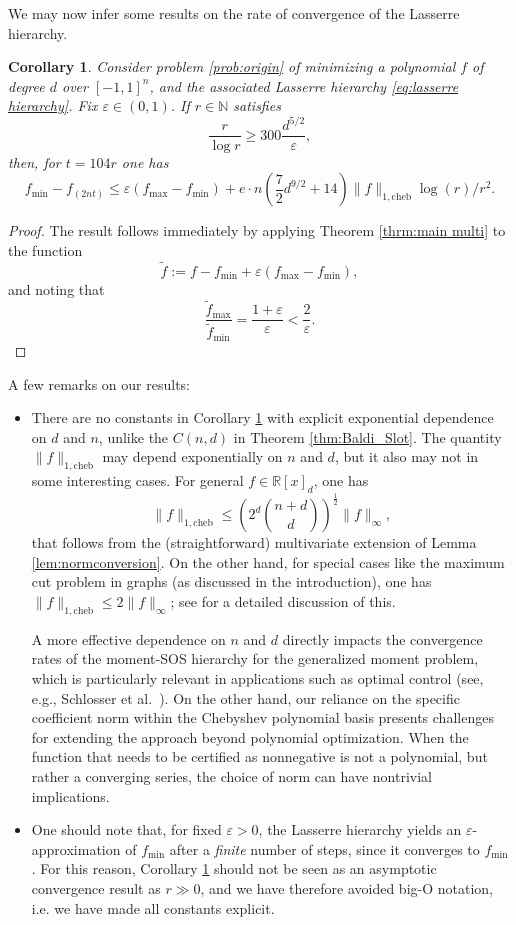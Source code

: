 \documentclass[11pt]{article}
\newcommand{\N}{\mathbb{N}}
\newcommand{\R}{\mathbb{R}}
\renewcommand{\min}{\mathrm{min}}
\renewcommand{\max}{\mathrm{max}}
\renewcommand{\epsilon}{\varepsilon}
\newtheorem{corollary}[defin]{Corollary}
\theoremstyle{definition}
\newcommand{\cheb}{{1,\mathrm{cheb}}}
\begin{document}
We may now infer some results on the rate of convergence of the Lasserre hierarchy.

\begin{corollary}
\label{cor:main result}
Consider problem \eqref{prob:origin} of minimizing a polynomial $f$ of degree $d$ over $[-1,1]^n$, and the associated Lasserre hierarchy \eqref{eq:lasserre hierarchy}.
Fix $\varepsilon \in (0,1)$. If  $r \in \N$ satisfies
\[
\frac{r}{\log r} \ge 300\frac{d^{5/2}}{\varepsilon},
\]
then, for $t = {104r}$ one has
\[
f_\min - f_{(2nt)} \le \varepsilon(f_\max - f_\min) + e\cdot n\left( {\frac{7}{2}d^{9/2}} + 14\right)\|f\|_\cheb \log(r)/r^2.
\]
\end{corollary}
\begin{proof}
The result follows immediately by applying Theorem \ref{thrm:main multi} to the function
\[
\tilde f := f - f_\min + \varepsilon (f_\max - f_\min),
\]
and noting that
\[
\frac{\tilde f_\max}{\tilde f_\min} = \frac{1+ \varepsilon}{\varepsilon} < \frac{2}{\epsilon}.
\]
\end{proof}
A few remarks on our results:
\begin{itemize}
\item
   There are no constants in Corollary \ref{cor:main result} with explicit exponential dependence on $d$ and $n$,  unlike the $C(n,d)$ in Theorem \ref{thm:Baldi_Slot}. The quantity $\|f\|_\cheb$ may depend exponentially on $n$ and $d$, but it also may not in some interesting cases.
   For general $f \in \R[x]_d$, one has
\[
\|f\|_\cheb \le \left(2^d \binom{n+d}{d}\right)^{ \frac{1}{2}}\|f\|_{\infty},
\]
that follows from the (straightforward) multivariate extension of Lemma \ref{lem:normconversion}. On the other hand, for special cases like the maximum cut problem in graphs (as discussed in the introduction), one has $\|f\|_\cheb \le 2\|f\|_{\infty}$; see \cite{De_Klerk_Vera_2024} for a detailed discussion of this.

{A more effective dependence on $n$ and $d$ directly impacts the convergence rates of the moment-SOS hierarchy
 for the generalized moment problem, which is particularly relevant in applications such as optimal control
 (see, e.g., Schlosser et al.\ \cite{Schlosser_et_al}). On the other hand,
 our reliance on the specific coefficient norm within the Chebyshev polynomial basis presents challenges
 for extending the approach beyond polynomial optimization. When the function
 that needs to be certified as nonnegative is not a polynomial, but rather a converging series, the choice of norm can have nontrivial implications. }
    \item
   One should note that, for fixed $\varepsilon > 0$, the Lasserre
   hierarchy yields an $\varepsilon$-approximation of $f_\min$ after a \textit{finite} number of steps, since it converges to $f_\min$.
   For this reason,
   Corollary \ref{cor:main result} should not be seen as an asymptotic convergence result as $r \gg 0$, and we have therefore avoided big-O notation, i.e. we have made all constants explicit.

   \end{itemize}
\end{document}
